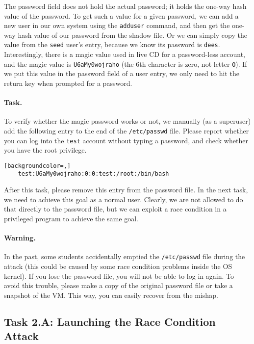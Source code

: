 The password field does not hold the actual password; it holds the one-way hash value of the
password. To get such a value for a given password, we can add a new user in our own system using
the \texttt{adduser} command, and then get the one-way hash value of our password from
the shadow file.  Or we can simply copy the value from the \texttt{seed} user's entry,
because we know its password is \texttt{dees}. Interestingly, there is a magic value
used in \ubuntu live CD for a password-less account, and the magic value is
\texttt{U6aMy0wojraho} (the 6th character is zero, not letter \texttt{O}). If we put this value
in the password field of a user entry, we only need to hit the return key when prompted for
a password.


\paragraph{Task.} To verify whether the magic password works or not, we
manually (as a superuser) add the following entry to the end of the \texttt{/etc/passwd} file. 
Please report whether you can log into the \texttt{test} account without
typing a password, and check whether you have the root privilege.

\begin{lstlisting}[backgroundcolor=,]
    test:U6aMy0wojraho:0:0:test:/root:/bin/bash
\end{lstlisting}

After this task, please remove this entry from the password file. In the
next task, we need to achieve this goal as a normal user. Clearly, we are
not allowed to do that directly to the password file, but we can exploit a
race condition in a privileged program to achieve the same goal.


\paragraph{Warning.}
In the past, some students accidentally emptied the {\tt /etc/passwd} file 
during the attack (this could be caused by some race condition problems
inside the OS kernel). If you lose
the password file, you will not be able to log in again. To avoid this 
trouble, please make a copy of the original password file or take a
snapshot of the VM. This way, you can easily recover from the mishap. 



\subsection{Task 2.A: Launching the Race Condition Attack}

